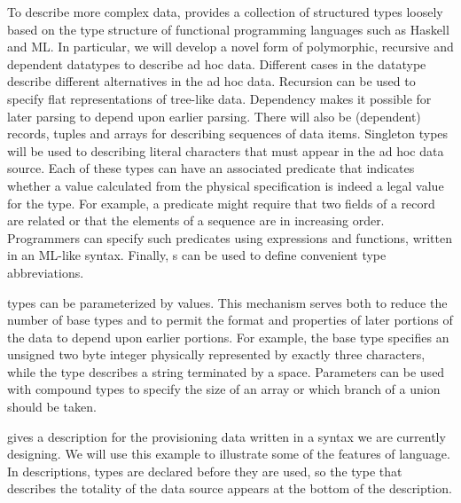 \documentclass[11pt]{article}
\begin{document}
To describe more complex data, \datatype{} provides a collection of
structured types loosely based on the type structure of functional
programming languages such as Haskell and ML.  In
particular, we will develop a novel form of 
polymorphic, recursive and dependent datatypes
to describe ad hoc data.  Different cases in the datatype describe
different alternatives in the ad hoc data.  Recursion can be used to
specify flat representations of tree-like data.  Dependency makes
it possible for later parsing to depend upon earlier parsing.
There will also be (dependent) records, tuples and arrays for describing sequences of data
items.  Singleton types will be used to describing literal characters that must
appear in the ad hoc data source. Each of
these types can have an associated predicate that indicates whether a
value calculated from the physical specification is indeed a legal
value for the type.  For example, a predicate might require that two
fields of a record are related or that the elements of a
sequence are in increasing order.  Programmers can specify such
predicates using \datatype{} expressions and functions, written in an
ML-like syntax.  Finally, s can be used to
define convenient type abbreviations.

\pads{} types can be parameterized by values.  This mechanism serves
both to reduce the number of base types and to permit the format and
properties of later portions of the data to depend upon earlier
portions.  For example, the base type  specifies
an unsigned two byte integer physically represented by exactly three
characters, while the type  describes a string
terminated by a space.  Parameters can be used with compound types to
specify the size of an array or which branch of a union should be
taken.


 gives a \datatype{} description for the \dibbler{} 
provisioning data written in a syntax we are currently designing.  
We will use this example to illustrate some of the features of 
\datatype{} language.  In \pads{} descriptions, types are declared before they are used, 
so the type that describes the totality of the data source appears at the bottom of 
the description.


% 
\end{document}
